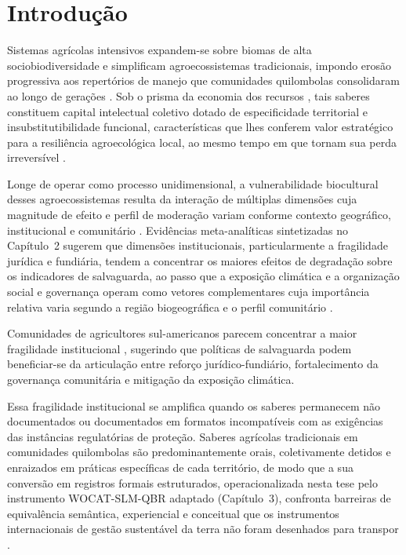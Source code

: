 \newpage

\section{Introdução}

Sistemas agrícolas intensivos expandem-se sobre biomas de alta sociobiodiversidade e simplificam agroecossistemas tradicionais, impondo erosão progressiva aos repertórios de manejo que comunidades quilombolas consolidaram ao longo de gerações \cite{Altieri2004}. Sob o prisma da economia dos recursos \cite{Barney1991}, tais saberes constituem capital intelectual coletivo dotado de especificidade territorial e insubstitutibilidade funcional, características que lhes conferem valor estratégico para a resiliência agroecológica local, ao mesmo tempo em que tornam sua perda irreversível \cite{Laborde2023,Ens2016}.

Longe de operar como processo unidimensional, a vulnerabilidade biocultural desses agroecossistemas resulta da interação de múltiplas dimensões cuja magnitude de efeito e perfil de moderação variam conforme contexto geográfico, institucional e comunitário \cite{ReyesGarcia2013,GomezBaggethun2013}. Evidências meta-analíticas sintetizadas no Capítulo~2 sugerem que dimensões institucionais, particularmente a fragilidade jurídica e fundiária, tendem a concentrar os maiores efeitos de degradação sobre os indicadores de salvaguarda, ao passo que a exposição climática e a organização social e governança operam como vetores complementares cuja importância relativa varia segundo a região biogeográfica e o perfil comunitário \cite{Santilli2009,Laird2020}.

Comunidades de agricultores sul-americanos parecem concentrar a maior fragilidade institucional \cite{TangGavin2016,CamaraLeret2021}, sugerindo que políticas de salvaguarda podem beneficiar-se da articulação entre reforço jurídico-fundiário, fortalecimento da governança comunitária e mitigação da exposição climática.

Essa fragilidade institucional se amplifica quando os saberes permanecem não documentados ou documentados em formatos incompatíveis com as exigências das instâncias regulatórias de proteção. Saberes agrícolas tradicionais em comunidades quilombolas são predominantemente orais, coletivamente detidos e enraizados em práticas específicas de cada território, de modo que a sua conversão em registros formais estruturados, operacionalizada nesta tese pelo instrumento WOCAT-SLM-QBR adaptado (Capítulo~3), confronta barreiras de equivalência semântica, experiencial e conceitual que os instrumentos internacionais de gestão sustentável da terra não foram desenhados para transpor \cite{Altieri2004,ReyesGarcia2013}.

